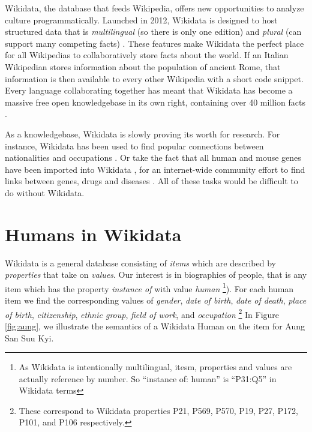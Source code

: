 \documentclass{sig-alternate-05-2015}
\begin{document}
Wikidata, the database that feeds Wikipedia, offers new opportunities to analyze culture programmatically. Launched in 2012, Wikidata is designed to host structured data that is \textit{multilingual} (so there is only one edition) and \textit{plural} (can support many competing facts) \cite{vrandecic_wikidata:_2014}.  These features make Wikidata the perfect place for all Wikipedias to collaboratively store facts about the world. If an Italian Wikipedian stores information about the population of ancient Rome, that information is then available to every other Wikipedia with a short code snippet. Every language collaborating together has meant that Wikidata has become a massive free open knowledgebase in its own right, containing over 40 million facts \cite{krotzsch_how_????}.

As a knowledgebase, Wikidata is slowly proving its worth for research. For instance, Wikidata has been used to find popular connections between nationalities and occupations \cite{goldfarb_quantifying_2015}. Or take the fact that all human and mouse genes have been imported into Wikidata \cite{mitraka_wikidata:_2015}, for an internet-wide community effort to find links between genes, drugs and diseases \cite{burgstaller-muehlbacher_wikidata_2015}. All of these tasks would be difficult to do without Wikidata.



\section{Humans in Wikidata}

Wikidata is a general database consisting of \textit{items} which are described by \textit{properties} that take on \textit{values}. Our interest is in biographies of people, that is any item which has the property \textit{instance of} with value \textit{human} \footnote{As Wikidata is intentionally multilingual, itesm, properties and values are actually reference by number. So ``instance of: human'' is ``P31:Q5'' in Wikidata terms }). For each human item we find the corresponding values of \textit{gender}, \textit{date of birth}, \textit{date of death}, \textit{place of birth}, \textit{citizenship}, \textit{ethnic group}, \textit{field of work}, and \textit{occupation} \footnote{These correspond to Wikidata properties P21, P569, P570, P19, P27, P172, P101, and P106 respectively.} In Figure \ref{fig:aung}, we illustrate the semantics of a Wikidata Human on the item for Aung San Suu Kyi.
 
\end{document}
